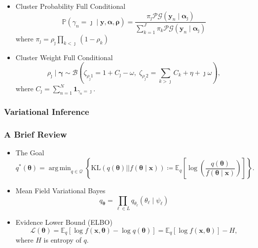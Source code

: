 \documentclass[aspectratio=169,10pt]{beamer}
\DeclareMathOperator*{\argmin}{arg\,min}
\begin{document}
\begin{frame}
    \frametitle{}
    \begin{itemize}
        \item Cluster Probability Full Conditional
        \[
        \mathbb{P}\left(\gamma_n = \jmath\mid \bm{y},\bm{\alpha},\bm{\rho}\right) = 
            \frac{\pi_\jmath\mathcal{PG}(\bm{y}_n\mid\bm{\alpha}_{\jmath})}{
                \sum_{k = 1}^J \pi_k\mathcal{PG}(\bm{y}_n\mid\bm{\alpha}_{\jmath})}
        \]
        where $\pi_{\jmath} = \rho_{\jmath}\prod_{k < \jmath}(1 - \rho_k)$
        \item Cluster Weight Full Conditional
        \[
        \rho_{\jmath}\mid\bm{\gamma} \sim 
            \mathcal{B}\left(\zeta_{\rho_\jmath 1} = 1 + C_{\jmath} - \omega,\; 
            \zeta_{\rho_{\jmath} 2} = {\textstyle \sum}_{k>\jmath} 
                C_k + \eta + \jmath \omega\right),
        \]
        where $C_\jmath = \sum_{n = 1}^N\bm{1}_{\gamma_n = \jmath}$.
    \end{itemize}
\end{frame} %

\subsubsection{Variational Inference}

\begin{frame}
    \frametitle{A Brief Review}
    \begin{itemize}
    \item The Goal
        \[
            q^*(\bm{\theta}) = \argmin_{q\in\mathcal{Q}}\left\lbrace
            \text{KL}\left(q(\bm{\theta})||f(\bm{\theta}\mid\bm{x})\right) 
            \coloneqq
            \mathbb{E}_{q}\left[\log\left(
            \frac{q(\bm{\theta})}{f(\bm{\theta}\mid\bm{x})}
            \right)\right]
            \right\rbrace.
        \]
    \item Mean Field Variational Bayes
        \[
            q_{\bm{\theta}} = \prod_{\ell \in L}
                q_{\theta_{\ell}}(\theta_{\ell}\mid\psi_{\ell})
        \]
    \item Evidence Lower Bound (ELBO)
        \[
            \mathcal{L}(\bm{\theta}) = 
                \mathbb{E}_q\left[\log f(\bm{x},\bm{\theta}) - 
                \log q(\bm{\theta})\right] 
            = \mathbb{E}_q[\log f(\bm{x},\bm{\theta})] - H,
        \]
    where $H$ is entropy of $q$.
    \end{itemize}
\end{frame} %
\end{document}
